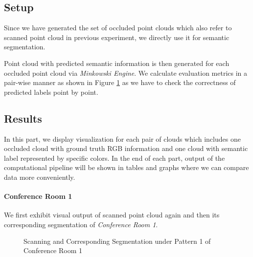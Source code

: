 \documentclass[11pt, a4paper,oneside,chapterprefix=false]{scrbook}
\begin{document}
\subsection{Setup}

Since we have generated the set of occluded point clouds which also refer to scanned point cloud in previous experiment, we directly use it for semantic segmentation.

Point cloud with predicted semantic information is then generated for each occluded point cloud via \emph{Minkowski Engine}. We calculate evaluation metrics in a pair-wise manner as shown in Figure \ref{fig:conf1 0 occ and seg} as we have to check the correctness of predicted labels point by point.


\subsection{Results}

In this part, we display visualization for each pair of clouds which includes one occluded cloud with ground truth RGB information and one cloud with semantic label represented by specific colors. In the end of each part, output of the computational pipeline will be shown in tables and graphs where we can compare data more conveniently.

\paragraph{Conference Room 1} \label{par:corre conf1}

We first exhibit visual output of scanned point cloud again and then its corresponding segmentation of \emph{Conference Room 1}.

\begin{figure}[H]
    \centering
      \label{fig:conf1 0 occluded} \hfill
     \label{fig:conf1 0 seg}
    \caption{Scanning and Corresponding Segmentation under Pattern 1 of Conference Room 1}
    \label{fig:conf1 0 occ and seg}
\end{figure}
\end{document}
